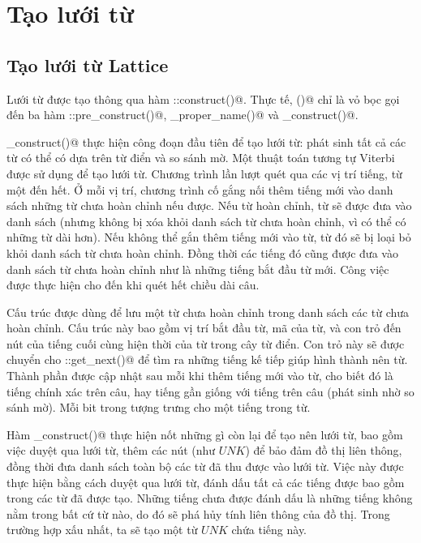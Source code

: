 \documentclass[a4paper,oneside,14pt]{extbook} %
\begin{document}
\section{Tạo lưới từ}
\subsection{Tạo lưới từ Lattice}
Lưới từ \verb@Lattice@ được tạo thông qua hàm
\verb@Lattice::construct()@. Thực tế, \verb@construct()@ chỉ là vỏ bọc
gọi đến ba hàm \verb@Lattice::pre_construct()@,
\verb@mark_proper_name()@ và \verb@post_construct()@.

\verb@pre_construct()@ thực hiện công đoạn đầu tiên để tạo lưới từ:
phát sinh tất cả các từ có thể có dựa trên từ điển và so sánh mờ. Một
thuật toán tương tự Viterbi được sử dụng để tạo lưới từ. Chương trình
lần lượt quét qua các vị trí tiếng, từ một đến hết. Ở mỗi vị trí,
chương trình cố gắng nối thêm tiếng mới vào danh sách những từ chưa
hoàn chỉnh nếu được. Nếu từ hoàn chỉnh, từ sẽ được đưa vào danh sách
(nhưng không bị xóa khỏi danh sách từ chưa hoàn chỉnh, vì có thể có
những từ dài hơn). Nếu không thể gắn thêm tiếng mới vào từ, từ đó sẽ
bị loại bỏ khỏi danh sách từ chưa hoàn chỉnh. Đồng thời các tiếng đó
cũng được đưa vào danh sách từ chưa hoàn chỉnh như là những tiếng bắt
đầu từ mới. Công việc được thực hiện cho đến khi quét hết chiều dài
câu. 

Cấu trúc \verb@WordState@ được dùng để lưu một từ chưa hoàn chỉnh
trong danh sách các từ chưa hoàn chỉnh. Cấu trúc này bao gồm vị trí
bắt đầu từ, mã \verb@fuzid@ của từ, và con trỏ đến nút của tiếng cuối cùng
hiện thời của từ trong cây từ điển. Con trỏ này sẽ được chuyển cho
\verb@WordNode::get_next()@ để tìm ra những tiếng kế tiếp giúp hình
thành nên từ. Thành phần \verb@fuzid@ được cập nhật sau mỗi khi thêm
tiếng mới vào từ, cho biết đó là tiếng chính xác trên câu, hay tiếng
gần giống với tiếng trên câu (phát sinh nhờ so sánh mờ). Mỗi bit trong
\verb@fuzid@ tượng trưng cho một tiếng trong từ.

Hàm \verb@post_construct()@ thực hiện nốt những gì còn lại để tạo nên
lưới từ, bao gồm việc duyệt qua lưới từ, thêm các nút (như $UNK$)
để bảo đảm đồ thị liên thông, đồng thời đưa danh sách toàn bộ các từ
đã thu được vào lưới từ. Việc này được thực hiện bằng cách duyệt qua
lưới từ, đánh dấu tất cả các tiếng được bao gồm trong các từ đã được
tạo. Những tiếng chưa được đánh dấu là những tiếng không nằm trong bất
cứ từ nào, do đó sẽ phá hủy tính liên thông của đồ thị. Trong trường
hợp xấu nhất, ta sẽ tạo một từ $UNK$ chứa tiếng này.
\end{document}
